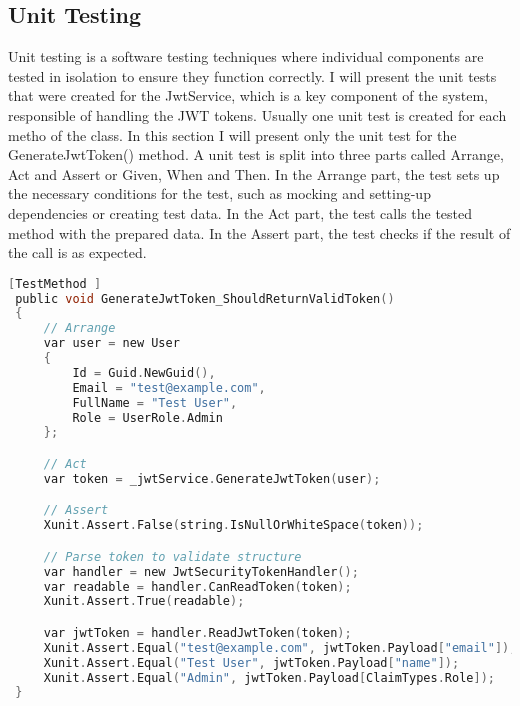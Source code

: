 \subsection{Unit Testing}
Unit testing is a software testing techniques where individual components are tested in isolation to ensure they function correctly.
I will present the unit tests that were created for the JwtService, which is a key component of the system, responsible of handling the JWT tokens.
Usually one unit test is created for each metho of the class. In this section I will present only the unit test for the GenerateJwtToken()
method. A unit test is split into three parts called Arrange, Act and Assert or Given, When and Then. In the Arrange part, the test
sets up the necessary conditions for the test, such as mocking and setting-up dependencies or creating test data. In the Act part, the test
calls the tested method with the prepared data. In the Assert part, the test checks if the result of the call is as expected.
\begin{lstlisting}[language=C, caption={Unit Test for GenerateJwtToken() Method in JwtService}, label={lst:jwt_unit_test}]
 [TestMethod ]
 public void GenerateJwtToken_ShouldReturnValidToken()
 {
     // Arrange
     var user = new User
     {
         Id = Guid.NewGuid(),
         Email = "test@example.com",
         FullName = "Test User",
         Role = UserRole.Admin
     };

     // Act
     var token = _jwtService.GenerateJwtToken(user);

     // Assert
     Xunit.Assert.False(string.IsNullOrWhiteSpace(token));

     // Parse token to validate structure
     var handler = new JwtSecurityTokenHandler();
     var readable = handler.CanReadToken(token);
     Xunit.Assert.True(readable);

     var jwtToken = handler.ReadJwtToken(token);
     Xunit.Assert.Equal("test@example.com", jwtToken.Payload["email"]);
     Xunit.Assert.Equal("Test User", jwtToken.Payload["name"]);
     Xunit.Assert.Equal("Admin", jwtToken.Payload[ClaimTypes.Role]);
 }
\end{lstlisting}

